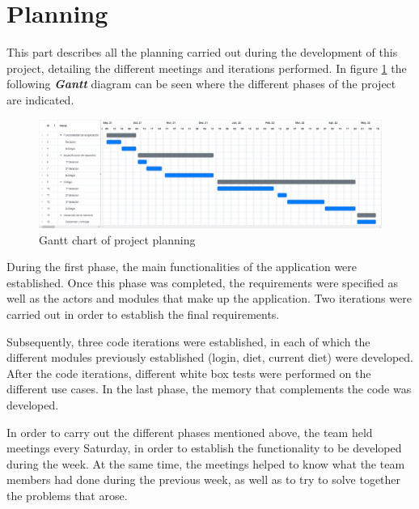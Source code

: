 \section{Planning}
This part describes all the planning carried out during the development of this project, detailing the different meetings and iterations performed. In figure  \ref{fig:gantt} the following \textbf{\textit{Gantt}} diagram can be seen where the different phases of the project are indicated.
\begin{figure}[H]
    \centering
    \includegraphics[width=\textwidth]{Images/gantt.png}
    \caption{Gantt chart of project planning}
    \label{fig:gantt}
\end{figure}

During the first phase, the main functionalities of the application were established. Once this phase was completed, the requirements were specified as well as the actors and modules that make up the application. Two iterations were carried out in order to establish the final requirements.

Subsequently, three code iterations were established, in each of which the different modules previously established (login, diet, current diet) were developed. After the code iterations, different white box tests were performed on the different use cases. In the last phase, the memory that complements the code was developed.

In order to carry out the different phases mentioned above, the team held meetings every Saturday, in order to establish the functionality to be developed during the week. At the same time, the meetings helped to know what the team members had done during the previous week, as well as to try to solve together the problems that arose.